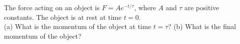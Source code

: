 The force acting on an object is
$F = Ae^{-t/\tau}$, where $A$ and $\tau$ are positive constants.
The object is at rest at time $t=0$.\\
%
(a) What is the momentum of the object at time $t = \tau$?\answercheck\hwendpart
%
(b) What is the final momentum of the object?\answercheck
